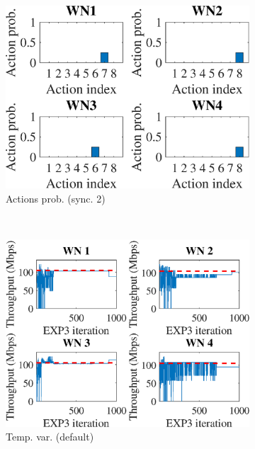 \documentclass[preprint,12pt]{article}
\begin{document}
\begin{figure}[h!]
\begin{subfigure}[b]{.3\textwidth}
		\includegraphics[width=\textwidth]{images/actions_probability_CEXP3}
		\caption{Actions prob. (sync. 2)}\label{fig:actions_probability_CEXP3}
	\end{subfigure}\\
	\begin{subfigure}[b]{.3\textwidth}
		\includegraphics[width=\textwidth]{images/temporal_individual_tpt_EXP3}
		\caption{Temp. var.  (default)}\label{fig:temporal_individual_tpt_EXP3}
	\end{subfigure}
	\begin{subfigure}[b]{.3\textwidth}

\end{subfigure}
\end{figure}
\end{document}
